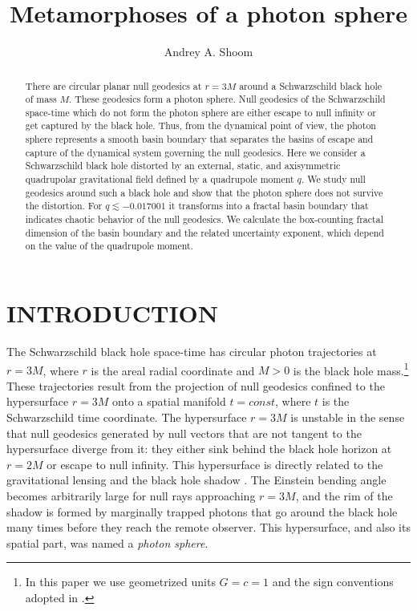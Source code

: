 \documentclass[twocolumn,showpacs,preprintnumbers,amsmath,amssymb,floatfix,nofootinbib]{revtex4-1}
\begin{document}
 
\title{Metamorphoses of a photon sphere}
\author{Andrey A. Shoom}

\begin{abstract}
There are circular planar null geodesics at $r=3M$ around a Schwarzschild black hole of mass $M$. These geodesics form a photon sphere. Null geodesics of the Schwarzschild space-time which do not form the photon sphere are either escape to null infinity or get captured by the black hole. Thus, from the dynamical point of view, the photon sphere represents a smooth basin boundary that separates the basins of escape and capture of the dynamical system governing the null geodesics. Here we consider a Schwarzschild black hole distorted by an external, static, and axisymmetric quadrupolar gravitational field defined by a quadrupole moment $q$. We study null geodesics around such a black hole and show that the photon sphere does not survive the distortion. For $q\lesssim-0.017001$ it transforms into a fractal basin boundary that indicates chaotic behavior of the null geodesics. We calculate the box-counting fractal dimension of the basin boundary and the related uncertainty exponent, which depend on the value of the quadrupole moment.
\end{abstract}


\maketitle

\section{INTRODUCTION}

The Schwarzschild black hole space-time has circular photon trajectories at $r=3M$, where $r$ is the areal radial coordinate and $M>0$ is the black hole mass.\footnote{In this paper we use geometrized units $G=c=1$ and the sign conventions adopted in \cite{MTW}.} These trajectories result from the projection of null geodesics confined to the hypersurface $r=3M$ onto a spatial manifold $t=const$, where $t$ is the Schwarzschild time coordinate. The hypersurface $r=3M$ is unstable in the sense that null geodesics generated by null vectors that are not tangent to the hypersurface diverge from it: they either sink behind the black hole horizon at $r=2M$ or escape to null infinity. This hypersurface is directly related to the gravitational lensing and the black hole shadow \cite{Perlick:2004tq,Perlick:2003vg,Whisker:2004gq,Perlick:2007nt,Virbhadra:2008ws,BinNun:2010ty,Perlick:2015vta,FZ}. The Einstein bending angle becomes arbitrarily large for null rays approaching $r=3M$, and the rim of the shadow is formed by marginally trapped photons that go around the black hole many times before they reach the remote observer. This hypersurface, and also its spatial part, was named a {\em photon sphere}. 
\end{document}
